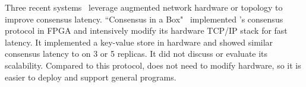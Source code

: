 % 
% 






  Three recent
systems~\cite{specpaxos:nsdi15,nopaxos:osdi16,consensusbox:nsdi16} leverage 
augmented network hardware or topology to improve \paxos consensus latency. 
``Consensus in a Box"~\cite{consensusbox:nsdi16} implemented \zookeeper's 
consensus protocol in FPGA and intensively modify its hardware TCP/IP stack for 
fast latency. It implemented a key-value store in hardware and showed similar 
consensus latency to \xxx on 3 or 5 replicas. It did not discuss or evaluate 
its scalability. Compared to this protocol, \xxx does not need to modify 
hardware, so it is easier to deploy and support general programs.

